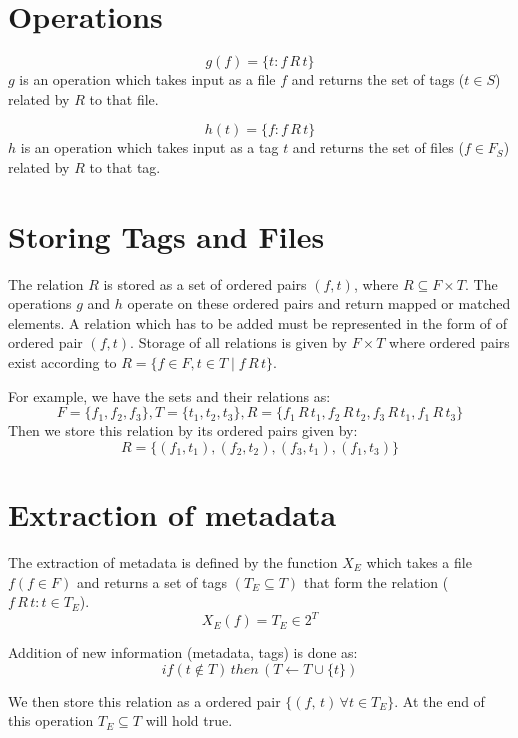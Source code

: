 \section{Operations}
$$g(f) = \{t : f \, R \, t\}$$
$g$ is an operation which takes input as a file $f$ and returns the set of tags ($t \in S$) related by $R$ to that file.

$$h(t) = \{f : f \, R \, t\}$$
$h$ is an operation which takes input as a tag $t$ and returns the set of files ($f \in F_{S}$) related by $R$ to that tag.


\section{Storing Tags and Files}
The relation $R$ is stored as a set of ordered pairs $(f,t)$, where $R \subseteq F \times T$. The operations $g$ and $h$ operate on these ordered pairs and return mapped or matched elements. A relation which has to be added must be represented in the form of of ordered pair $(f,t)$. Storage of all relations is given by $F \times T$ where ordered pairs exist according to $R = \{f \in F, t \in T \mid f\, R \,t\}$.

\noindent For example, we have the sets and their relations as: 
$$F = \{ f_{1}, f_{2}, f_{3} \}, T = \{ t_{1}, t_{2}, t_{3} \}, R = \{f_{1} \, R  \, t_{1}, f_{2}  \, R  \, t_{2}, f_{3}  \, R  \, t_{1}, f_{1}  \, R  \, t_{3}\}$$
Then we store this relation by its ordered pairs given by:
$$R = \{(f_{1},t_{1}),(f_{2}, t_{2}),(f_{3}, t_{1}),(f_{1}, t_{3})\}$$

\section{Extraction of metadata}
The extraction of metadata is defined by the function $X_{E}$ which takes a file $f(f \in F)$ and returns a set of tags $(T_{E} \subseteq T)$ that form the relation ($f  \, R  \, t : t \in T_{E}$). 
$$X_{E}(f) = T_{E} \in 2^{T}$$

\noindent Addition of new information (metadata, tags) is done as:
$${if (t \notin T) \, then \, (T \gets T \cup \{t\})}$$

\noindent We then store this relation as a ordered pair $\{(f, \, t) \, \forall t \in T_{E}\}$. At the end of this operation $T_{E} \subseteq T$ will hold true. 

